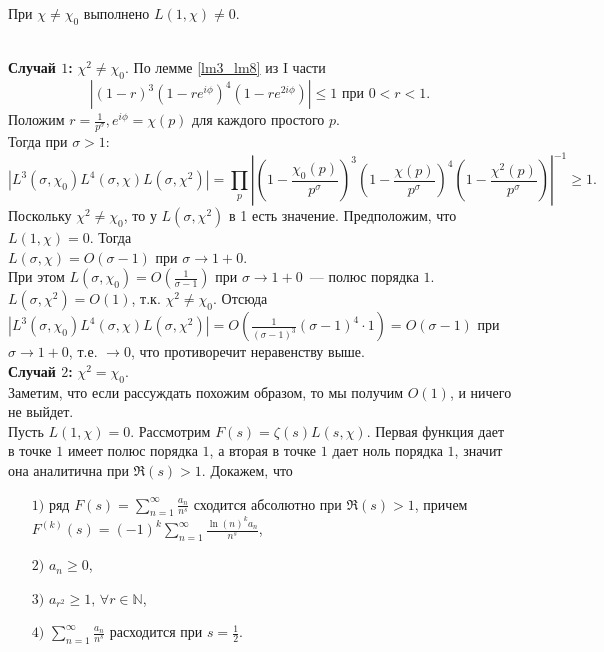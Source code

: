 \begin{lemma} \label{l7_lm7}
	При $\chi \ne \chi_0$ выполнено $L(1, \chi) \ne 0$.
\end{lemma}
\begin{pf}~\\
	\textbf{Случай $1$:} $\chi^2 \ne \chi_0$.
	По лемме \ref{lm3_lm8} из I части
	$$|(1 - r)^3 (1 - re^{i \phi})^4 (1 - re^{2i\phi})| \leq 1 \text{ при } 0 < r < 1.$$
	Положим $\displaystyle r = \frac{1}{p^{\sigma}}, e^{i \phi} = \chi(p)$ для каждого простого $p$.\\
	Тогда при $\sigma > 1$:
	$$|L^3(\sigma, \chi_0) L^4(\sigma, \chi) L (\sigma, \chi^2)| = \prod_p \left|\left(1 - \frac{\chi_0(p)}{p^{\sigma}}\right)^3\left(1 - \frac{\chi(p)}{p^{\sigma}}\right)^4\left(1 - \frac{\chi^2(p)}{p^{\sigma}}\right) \right|^{-1} \geq 1.$$
	Поскольку $\chi^2 \ne \chi_0$, то у $L(\sigma, \chi^2)$ в 1 есть значение. Предположим, что $L(1, \chi) = 0$. Тогда\\
	$L(\sigma, \chi) = O(\sigma - 1)$ при $\sigma \rightarrow 1+0$.\\
	При этом $\displaystyle L(\sigma, \chi_0) = O(\frac{1}{\sigma - 1})$ при $\sigma \rightarrow 1+0$ — полюс порядка $1$.\\
	$L(\sigma, \chi^2) = O(1)$, т.к. $\chi^2 \ne \chi_0$.
	Отсюда $\displaystyle |L^3(\sigma, \chi_0) L^4(\sigma, \chi) L(\sigma, \chi^2)| = O(\frac{1}{(\sigma - 1)^3} (\sigma - 1)^4 \cdot 1) = O(\sigma - 1)$ при $\sigma \rightarrow 1+0$, т.е. $\rightarrow 0$, что противоречит неравенству выше.\\
	\textbf{Случай $2$:} $\chi^2 = \chi_0$.\\
	Заметим, что если рассуждать похожим образом, то мы получим $O(1)$, и ничего не выйдет.\\
	Пусть $L(1, \chi) = 0$. Рассмотрим $F(s) = \zeta(s) L(s, \chi)$. Первая функция дает в точке $1$ имеет полюс порядка $1$, а вторая в точке $1$ дает ноль порядка $1$, значит она аналитична при $\Re(s) > 1$.
	Докажем, что
	\begin{itemize}[nolistsep]
		\item[$1)$] ряд $\displaystyle F(s) = \sum\limits_{n=1}^\infty \frac{a_n}{n^s}$ сходится абсолютно при $\Re(s) > 1$, причем $\displaystyle F^{(k)}(s) = (-1)^k \sum_{n = 1}^{\infty} \frac{\ln(n)^k a_n}{n^s}$,
		\item[$2)$] $a_n \geq 0$,
		\item[$3)$] $a_{r^2} \geq 1, \, \forall r \in \mathbb{N}$,
		\item[$4)$] $\displaystyle \sum\limits_{n=1}^\infty \frac{a_n}{n^s} $ расходится при $\displaystyle s = \frac{1}{2}$.

\end{itemize}
\end{pf}
